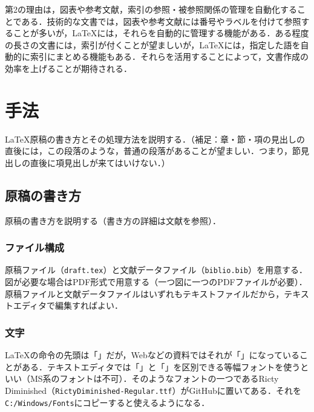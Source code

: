 \documentclass[uplatex,twocolumn,dvipdfmx]{jsarticle}
\begin{document}
第2の理由は，図表や参考文献，索引の参照・被参照関係の管理を自動化することである．技術的な文書では，図表や参考文献には番号やラベルを付けて参照することが多いが，\LaTeX には，それらを自動的に管理する機能がある．ある程度の長さの文書には，索引が付くことが望ましいが，\LaTeX には，指定した語を自動的に索引にまとめる機能もある．それらを活用することによって，文書作成の効率を上げることが期待される．

\section{手法}

\LaTeX 原稿の書き方とその処理方法を説明する．（補足：章・節・項の見出しの直後には，この段落のような，普通の段落があることが望ましい．つまり，節見出しの直後に項見出しが来てはいけない．）

\subsection{原稿の書き方}

原稿の書き方を説明する（書き方の詳細は文献\cite{okumura2017}を参照）．

\subsubsection{ファイル構成}

原稿ファイル（\verb|draft.tex|）と文献データファイル（\verb|biblio.bib|）を用意する．図が必要な場合はPDF形式で用意する（一つ図に一つのPDFファイルが必要）．原稿ファイルと文献データファイルはいずれもテキストファイルだから，テキストエディタで編集すればよい．

\subsubsection{文字}

\LaTeX の命令の先頭は「\hspace{-0.5zw}」だが，Webなどの資料ではそれが「\hspace{-0.5zw}」になっていることがある．テキストエディタでは「\hspace{-0.5zw}」と「\hspace{-0.5zw}」を区別できる等幅フォントを使うといい（MS系のフォントは不可）．そのようなフォントの一つであるRicty Diminished（\verb|RictyDiminished-Regular.ttf|）がGitHubに置いてある．それを\verb|C:/Windows/Fonts|にコピーすると使えるようになる．
\end{document}
